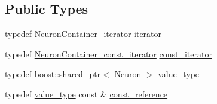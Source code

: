 \subsection*{Public Types}
\begin{DoxyCompactItemize}
\item 
typedef \hyperlink{_a_m_o_r_e_8h_ad078671e849859e6841fe59c932067f5}{NeuronContainer\_\-iterator} \hyperlink{class_neuron_container_abf81356adaea3bfc64aa03777e9a8def}{iterator}
\item 
typedef \hyperlink{_a_m_o_r_e_8h_aac7ebfe62ebc9c8933b145f6a1562540}{NeuronContainer\_\-const\_\-iterator} \hyperlink{class_neuron_container_a41749602f05e7610da7f0f1fd59f5442}{const\_\-iterator}
\item 
typedef boost::shared\_\-ptr$<$ \hyperlink{class_neuron}{Neuron} $>$ \hyperlink{class_neuron_container_ac067345f1d27a5b04e4d9487b319ccaa}{value\_\-type}
\item 
typedef \hyperlink{class_neuron_container_ac067345f1d27a5b04e4d9487b319ccaa}{value\_\-type} const \& \hyperlink{class_neuron_container_a468ffbb00b15553f73da46dd62c91c8d}{const\_\-reference}
\end{DoxyCompactItemize}
